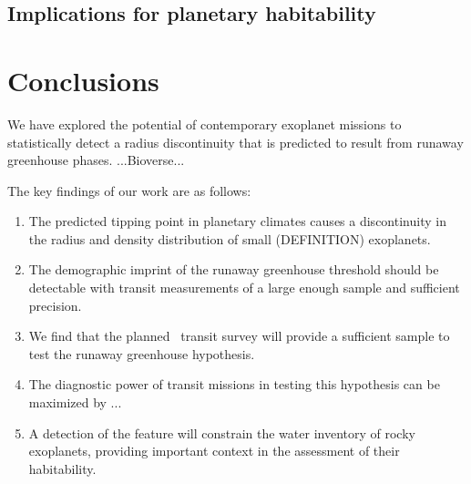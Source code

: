 \documentclass[modern]{aastex631}
\begin{document}
\subsection{Implications for planetary habitability}\label{sec:habitability}



\section{Conclusions}
\begin{note}
    We have explored the potential of contemporary exoplanet missions to statistically detect a radius discontinuity that is predicted to result from runaway greenhouse phases.
    ...Bioverse...
\end{note}

The key findings of our work are as follows:
\begin{enumerate}
    \item The predicted tipping point in planetary climates causes a discontinuity in the radius and density distribution of small (DEFINITION) exoplanets.
    \item The demographic imprint of the runaway greenhouse threshold should be detectable with transit measurements of a large enough sample and sufficient precision.
    \item We find that the planned \plato\ transit survey will provide a sufficient sample to test the runaway greenhouse hypothesis.
    \item The diagnostic power of transit missions in testing this hypothesis can be maximized by ...
    \item A detection of the feature will constrain the water inventory of rocky exoplanets, providing important context in the assessment of their habitability.
\end{enumerate}



\end{document}
